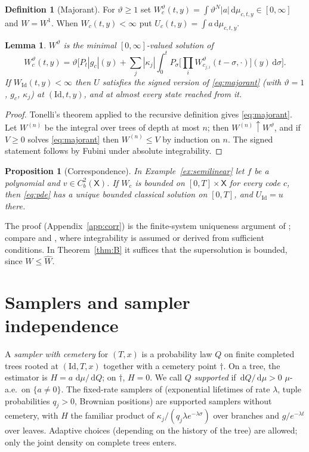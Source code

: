 \documentclass[11pt]{article}
\newtheorem{proposition}[theorem]{Proposition}
\newtheorem{lemma}[theorem]{Lemma}
\theoremstyle{definition}
\newtheorem{definition}[theorem]{Definition}
\theoremstyle{remark}
\newcommand{\X}{\mathsf{X}}
\newcommand{\Id}{\mathrm{Id}}
\newcommand{\dd}{\,\mathrm{d}}
\newcommand{\Wh}{\widehat W}
\begin{document}
\begin{definition}[Majorant]
For $\vartheta\ge1$ set
$W^\vartheta_c(t,y)=\int\vartheta^{N}|a|\dd\mu_{c,t,y}\in[0,\infty]$ and
$W=W^1$. When $W_c(t,y)<\infty$ put $U_c(t,y)=\int a\dd\mu_{c,t,y}$.
\end{definition}

\begin{lemma}\label{lem:majorant}
$W^\vartheta$ is the minimal $[0,\infty]$-valued solution of
\begin{equation}\label{eq:majorant}
W^\vartheta_c(t,y)=\vartheta\Big[P_t|g_c|(y)+\sum_j|\kappa_j|\int_0^t
P_\sigma\Big[\prod_iW^\vartheta_{c_{j,i}}(t-\sigma,\cdot)\Big](y)\dd\sigma\Big].
\end{equation}
If $W_\Id(t,y)<\infty$ then $U$ satisfies the signed version of
\eqref{eq:majorant} (with $\vartheta=1$, $g_c$, $\kappa_j$) at $(\Id,t,y)$,
and at almost every state reached from it.
\end{lemma}
\begin{proof}
Tonelli's theorem applied to the recursive definition gives
\eqref{eq:majorant}. Let $W^{(n)}$ be the integral over trees of depth at
most $n$; then $W^{(n)}\uparrow W^\vartheta$, and if $V\ge0$ solves
\eqref{eq:majorant} then $W^{(n)}\le V$ by induction on $n$. The signed
statement follows by Fubini under absolute integrability.
\end{proof}

\begin{proposition}[Correspondence]\label{prop:corr}
In Example~\ref{ex:semilinear} let $f$ be a polynomial and $v\in C^2_b(\X)$.
If $W_c$ is bounded on $[0,T]\times\X$ for every code $c$, then
\eqref{eq:pde} has a unique bounded classical solution on $[0,T]$, and
$U_\Id=u$ there.
\end{proposition}
The proof (Appendix~\ref{app:corr}) is the finite-system uniqueness
argument of \cite[Thm.~3.2]{HLT21}; compare \cite[Thm.~4.2]{NPP23} and
\cite{HP25}, where integrability is assumed or derived from sufficient
conditions. In Theorem~\ref{thm:B} it suffices that the supersolution is
bounded, since $W\le\Wh$.

\section{Samplers and sampler independence}\label{sec:A}

A \emph{sampler with cemetery} for $(T,x)$ is a probability law $Q$ on
finite completed trees rooted at $(\Id,T,x)$ together with a cemetery
point $\dagger$. On a tree, the estimator is
$H=a\,\dd\mu/\dd Q$; on $\dagger$, $H=0$. We call $Q$ \emph{supported}
if $\dd Q/\dd\mu>0$ $\mu$-a.e.\ on $\{a\ne0\}$. The fixed-rate samplers of
\cite{HLOTTW19,NPP23} (exponential lifetimes of rate $\lambda$, tuple
probabilities $q_j>0$, Brownian positions) are supported samplers without
cemetery, with $H$ the familiar product of $\kappa_j/(q_j\lambda
e^{-\lambda\sigma})$ over branches and $g/e^{-\lambda t}$ over leaves.
Adaptive choices (depending on the history of the tree) are allowed; only
the joint density on complete trees enters.
\end{document}
